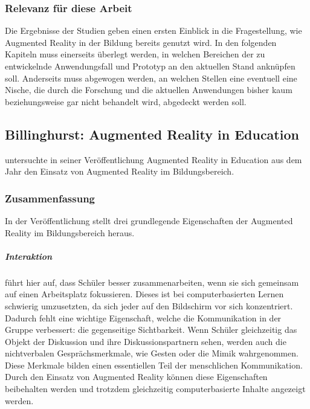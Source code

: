 \subsubsection{Relevanz für diese Arbeit}
Die Ergebnisse der Studien geben einen ersten Einblick in die Fragestellung, wie Augmented Reality in der Bildung bereits genutzt wird. In den folgenden Kapiteln muss einerseits überlegt werden, in welchen Bereichen der zu entwickelnde Anwendungsfall und Prototyp an den aktuellen Stand anknüpfen soll. Anderseits muss abgewogen werden, an welchen Stellen eine eventuell eine Nische, die durch die Forschung und die aktuellen Anwendungen bisher kaum beziehungsweise gar nicht behandelt wird, abgedeckt werden soll.


\subsection{Billinghurst: Augmented Reality in Education}\label{sec:billinghurst-ar-education}
\citeauthor{billinghurst:ar-in-education} untersuchte in seiner Veröffentlichung \glqq Augmented Reality in Education\grqq{} aus dem Jahr \citeyear{billinghurst:ar-in-education} den Einsatz von Augmented Reality im Bildungsbereich.\\

\subsubsection{Zusammenfassung}
In der Veröffentlichung stellt \citeauthor{billinghurst:ar-in-education} drei grundlegende Eigenschaften der Augmented Reality im Bildungsbereich heraus.

\subparagraph{Interaktion}
\citeauthor{billinghurst:ar-in-education} führt hier auf, dass Schüler besser zusammenarbeiten, wenn sie sich gemeinsam auf einen Arbeitsplatz fokussieren. Dieses ist bei computerbasierten Lernen schwierig umzusetzten, da sich jeder auf den Bildschirm vor sich konzentriert. Dadurch fehlt eine wichtige Eigenschaft, welche die Kommunikation in der Gruppe verbessert: die gegenseitige Sichtbarkeit. Wenn Schüler gleichzeitig das Objekt der Diskussion und ihre Diskussionspartnern sehen, werden auch die nichtverbalen Gesprächsmerkmale, wie Gesten oder die Mimik wahrgenommen. Diese Merkmale bilden einen essentiellen Teil der menschlichen Kommunikation. 
Durch den Einsatz von Augmented Reality können diese Eigenschaften beibehalten werden und trotzdem gleichzeitig computerbasierte Inhalte angezeigt werden. \citep[S. 2-3]{billinghurst:ar-in-education}


